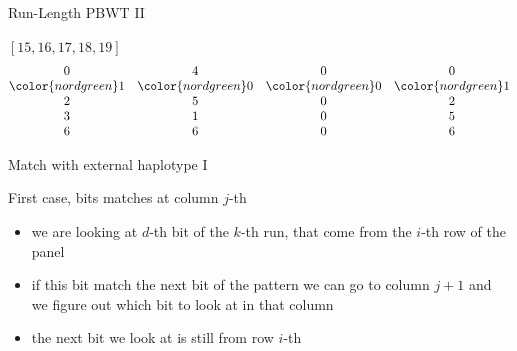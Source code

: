 \documentclass{beamer}
\begin{document}
\begin{frame}{Run-Length PBWT II}
\begin{block}{$[15,16,17,18,19]$}
{{\[                                                                                                                                                                                \begin{matrix}  
                                                                                                                                                                                0 & 4 & 0 & 0\\
                    \color{nordgreen} 1 & \color{nordgreen} 0 & \color{nordgreen} 0 &
                                                                                                                                                                                \color{nordgreen} 1\\
                    2 & 5 & 0 & 2\\
                    3 & 1 & 0 & 5\\
                    6 & 6 & 0 & 6
                                                                    \end{matrix}\]}}
                                                                    \end{block}
                                                                    \end{frame}
                                                                    \begin{frame}{Match with external haplotype I}
                                                                    \begin{block}{First case, bits matches at column $j$-th}
                                                                    \begin{itemize}
                                                                    \item we are looking at $d$-th bit of the $k$-th run, that come from the
                                                                    $i$-th row of the panel 
                                                                    \item if this bit match the next bit of the pattern we can go to column
                                                                    $j+1$ and we figure out which bit to look at in that column 
                                                                    \item the next bit we look at is still from row $i$-th
                                                                    \end{itemize}
                                                                    \end{block}
                                                                    \end{frame}
\end{document}
